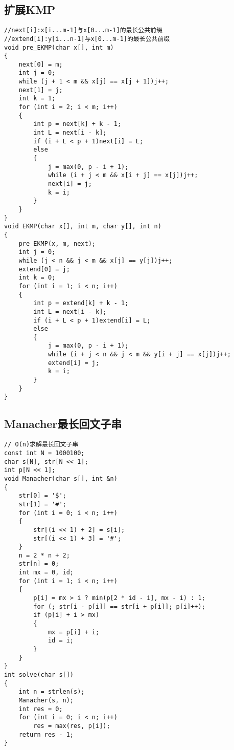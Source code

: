 \documentclass[a4]{article}
\begin{document}
\subsection{扩展KMP}
\begin{lstlisting}
//next[i]:x[i...m-1]与x[0...m-1]的最长公共前缀
//extend[i]:y[i...n-1]与x[0...m-1]的最长公共前缀
void pre_EKMP(char x[], int m)
{
    next[0] = m;
    int j = 0;
    while (j + 1 < m && x[j] == x[j + 1])j++;
    next[1] = j;
    int k = 1;
    for (int i = 2; i < m; i++)
    {
        int p = next[k] + k - 1;
        int L = next[i - k];
        if (i + L < p + 1)next[i] = L;
        else
        {
            j = max(0, p - i + 1);
            while (i + j < m && x[i + j] == x[j])j++;
            next[i] = j;
            k = i;
        }
    }
}
void EKMP(char x[], int m, char y[], int n)
{
    pre_EKMP(x, m, next);
    int j = 0;
    while (j < n && j < m && x[j] == y[j])j++;
    extend[0] = j;
    int k = 0;
    for (int i = 1; i < n; i++)
    {
        int p = extend[k] + k - 1;
        int L = next[i - k];
        if (i + L < p + 1)extend[i] = L;
        else
        {
            j = max(0, p - i + 1);
            while (i + j < n && j < m && y[i + j] == x[j])j++;
            extend[i] = j;
            k = i;
        }
    }
}
\end{lstlisting}
\subsection{Manacher最长回文子串}
\begin{lstlisting}
// O(n)求解最长回文子串
const int N = 1000100;
char s[N], str[N << 1];
int p[N << 1];
void Manacher(char s[], int &n)
{
    str[0] = '$';
    str[1] = '#';
    for (int i = 0; i < n; i++)
    {
        str[(i << 1) + 2] = s[i];
        str[(i << 1) + 3] = '#';
    }
    n = 2 * n + 2;
    str[n] = 0;
    int mx = 0, id;
    for (int i = 1; i < n; i++)
    {
        p[i] = mx > i ? min(p[2 * id - i], mx - i) : 1;
        for (; str[i - p[i]] == str[i + p[i]]; p[i]++);
        if (p[i] + i > mx)
        {
            mx = p[i] + i;
            id = i;
        }
    }
}
int solve(char s[])
{
    int n = strlen(s);
    Manacher(s, n);
    int res = 0;
    for (int i = 0; i < n; i++)
        res = max(res, p[i]);
    return res - 1;
}
\end{lstlisting}
\end{document}
